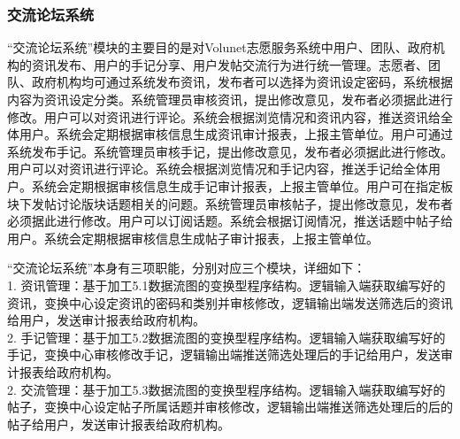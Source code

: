 \subsubsection{交流论坛系统}



“交流论坛系统”模块的主要目的是对Volunet志愿服务系统中用户、团队、政府机构的资讯发布、用户的手记分享、用户发帖交流行为进行统一管理。志愿者、团队、政府机构均可通过系统发布资讯，发布者可以选择为资讯设定密码，系统根据内容为资讯设定分类。系统管理员审核资讯，提出修改意见，发布者必须据此进行修改。用户可以对资讯进行评论。系统会根据浏览情况和资讯内容，推送资讯给全体用户。系统会定期根据审核信息生成资讯审计报表，上报主管单位。用户可通过系统发布手记。系统管理员审核手记，提出修改意见，发布者必须据此进行修改。用户可以对资讯进行评论。系统会根据浏览情况和手记内容，推送手记给全体用户。系统会定期根据审核信息生成手记审计报表，上报主管单位。用户可在指定板块下发帖讨论版块话题相关的问题。系统管理员审核帖子，提出修改意见，发布者必须据此进行修改。用户可以订阅话题。系统会根据订阅情况，推送话题中帖子给用户。系统会定期根据审核信息生成帖子审计报表，上报主管单位。

“交流论坛系统”本身有三项职能，分别对应三个模块，详细如下：\\
1. 资讯管理：基于加工5.1数据流图的变换型程序结构。逻辑输入端获取编写好的资讯，变换中心设定资讯的密码和类别并审核修改，逻辑输出端发送筛选后的资讯给用户，发送审计报表给政府机构。\\
2. 手记管理：基于加工5.2数据流图的变换型程序结构。逻辑输入端获取编写好的手记，变换中心审核修改手记，逻辑输出端推送筛选处理后的手记给用户，发送审计报表给政府机构。\\
2. 交流管理：基于加工5.3数据流图的变换型程序结构。逻辑输入端获取编写好的帖子，变换中心设定帖子所属话题并审核修改，逻辑输出端推送筛选处理后的后的帖子给用户，发送审计报表给政府机构。

\begin{landscape}
\begin{figure}[bp]
    \end{figure}
\end{landscape}

